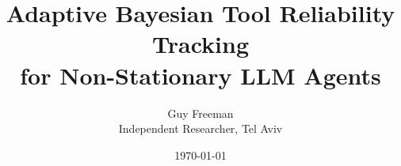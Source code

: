 \documentclass[11pt]{article}
\title{Adaptive Bayesian Tool Reliability Tracking \\for Non-Stationary LLM Agents}
\author{
  Guy Freeman \\
  Independent Researcher, Tel Aviv
}
\date{\today}
\newcommand{\credence}{\textsc{Credence}}
\begin{document}
\maketitle

\begin{abstract}
\end{abstract}



%

%
\end{document}
